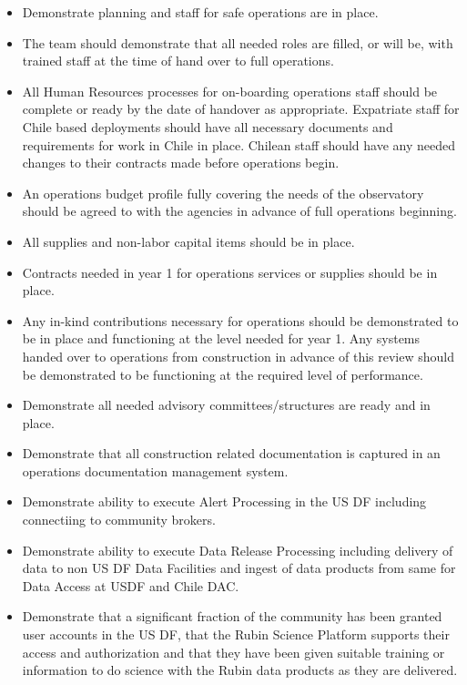 \begin{itemize}

	\item Demonstrate planning and staff for safe operations are in place. 
	\item The team should demonstrate that all needed roles are filled, or will be, with 
trained staff at the time of hand over to full operations.
	\item All Human Resources processes for on-boarding operations staff should be complete 
or ready by the date of handover as appropriate. Expatriate staff for Chile based deployments 
should have all necessary documents and requirements for work in Chile in place. Chilean staff 
should have any needed changes to their contracts made before operations begin. 
	\item An operations budget profile fully covering the needs of the observatory should be 
agreed to with the agencies in advance of full operations beginning.
	\item All supplies and non-labor capital items should be in place. 
	\item Contracts needed in year 1 for operations services or supplies should be in place. 
	\item Any in-kind contributions necessary for operations should be demonstrated to be in 
place and functioning at the level needed for year 1. Any systems handed over to operations 
from construction in advance of this review should be demonstrated to be functioning at the 
required level of performance.
	\item Demonstrate all needed advisory committees/structures are ready and in place.
	\item Demonstrate that all construction related documentation is captured 
in an operations documentation management system.
	\item Demonstrate ability to execute Alert Processing in the US DF including connectiing to community brokers.
	\item Demonstrate ability to execute Data Release Processing including delivery of data to
non US DF Data Facilities and ingest of data products from same for Data Access at USDF and Chile
DAC.  
	\item Demonstrate that a significant fraction of the community has been granted 
user accounts in the US DF, that the Rubin Science Platform supports their access and 
authorization and that they have been given suitable training or information to do science 
with the Rubin data products as they are delivered.

\end{itemize}

